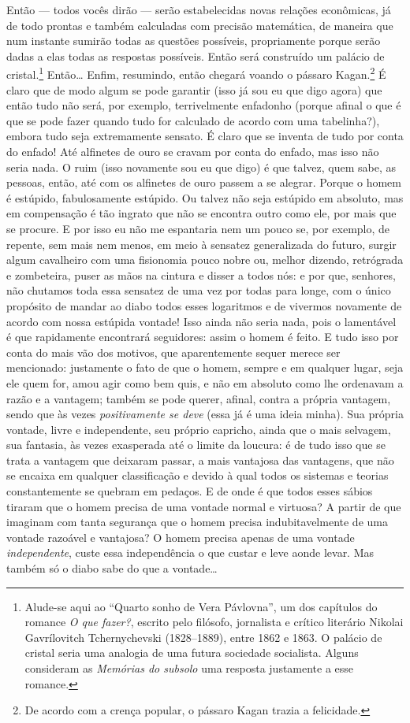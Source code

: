 Então --- todos vocês dirão --- serão estabelecidas novas relações econômicas,
já de todo prontas e também calculadas com precisão matemática, de maneira que
num instante sumirão todas as questões possíveis, propriamente porque serão
dadas a elas todas as respostas possíveis. Então será construído um palácio de
cristal.\footnote{ Alude-se aqui ao “Quarto sonho de Vera Pávlovna”, um dos
capítulos do romance \textit{O que fazer?}, escrito pelo filósofo,
jornalista e crítico literário Nikolai Gavrílovitch Tchernychevski (1828--1889),
entre 1862 e 1863. O palácio de cristal seria uma analogia de uma futura
sociedade socialista. Alguns consideram as \textit{Memórias do subsolo} uma
resposta justamente a esse romance.} Então\ldots{} Enfim, resumindo, então
chegará voando o pássaro Kagan.\footnote{ De acordo com a crença popular, o
pássaro Kagan trazia a felicidade.} É claro que de modo algum se pode garantir
(isso já sou eu que digo agora) que então tudo não será, por exemplo,
terrivelmente enfadonho (porque afinal o que é que se pode fazer quando tudo
for calculado de acordo com uma tabelinha?), embora tudo seja extremamente
sensato. É claro que se inventa de tudo por conta do enfado! Até alfinetes de
ouro se cravam por conta do enfado, mas isso não seria nada. O ruim (isso
novamente sou eu que digo) é que talvez, quem sabe, as pessoas, então, até com
os alfinetes de ouro passem a se alegrar.  Porque o homem é estúpido,
fabulosamente estúpido. Ou talvez não seja estúpido em absoluto, mas em
compensação é tão ingrato que não se encontra outro como ele, por mais que se
procure. E por isso eu não me espantaria nem um pouco se, por exemplo, de
repente, sem mais nem menos, em meio à sensatez generalizada do futuro, surgir
algum cavalheiro com uma fisionomia pouco nobre ou, melhor dizendo, retrógrada
e zombeteira, puser as mãos na cintura e disser a todos nós: e por que,
senhores, não chutamos toda essa sensatez de uma vez por todas para longe, com
o único propósito de mandar ao diabo todos esses logaritmos e de vivermos
novamente de acordo com nossa estúpida vontade! Isso ainda não seria nada, pois
o lamentável é que rapidamente encontrará seguidores: assim o homem é feito. E
tudo isso por conta do mais vão dos motivos, que aparentemente sequer merece
ser mencionado: justamente o fato de que o homem, sempre e em qualquer lugar,
seja ele quem for, amou agir como bem quis, e não em absoluto como lhe
ordenavam a razão e a vantagem; também se pode querer, afinal, contra a própria
vantagem, sendo que às vezes \textit{positivamente se deve} (essa já é uma
ideia minha). Sua própria vontade, livre e independente, seu próprio capricho,
ainda que o mais selvagem, sua fantasia, às vezes exasperada até o limite da
loucura: é de tudo isso que se trata a vantagem que deixaram passar, a mais
vantajosa das vantagens, que não se encaixa em qualquer classificação e devido
à qual todos os sistemas e teorias constantemente se quebram em pedaços. E de
onde é que todos esses sábios tiraram que o homem precisa de uma vontade normal
e virtuosa? A partir de que imaginam com tanta segurança que o homem precisa
indubitavelmente de uma vontade razoável e vantajosa? O homem precisa apenas de
uma vontade \textit{independente}, custe essa independência o que custar e leve
aonde levar. Mas também só o diabo sabe do que a vontade\ldots{}


